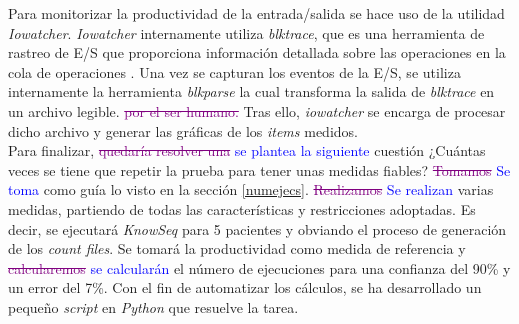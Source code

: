 \begin{table}[h]
    \centering
    \caption{Tiempos de ejecución para KnowSeq con distinto número de pacientes}
    \label{tab:my_label}
\end{table}
\begin{table}[h]
    \centering
\end{table}

Para monitorizar la productividad de la entrada/salida se hace uso de la utilidad \textit{Iowatcher}. \textit{Iowatcher} internamente utiliza \textit{blktrace}, que es una herramienta de rastreo de E/S que proporciona información detallada sobre las operaciones en la cola de operaciones \cite{blktrace}. Una vez se capturan los eventos de la E/S, se utiliza internamente la herramienta \textit{blkparse} la cual transforma la salida de \textit{blktrace} en un archivo legible. \textcolor{purple}{\sout{por el ser humano.}} Tras ello, \textit{iowatcher} se encarga de procesar dicho archivo y generar las gráficas de los \textit{items} medidos.\\

Para finalizar, \textcolor{purple}{\sout{quedaría resolver una}} \textcolor{blue}{se plantea la siguiente} cuestión ¿Cuántas veces se tiene que repetir la prueba para tener unas medidas fiables? \textcolor{purple}{\sout{Tomamos}} \textcolor{blue}{Se toma} como guía lo visto en la sección \ref{numejecs}. \textcolor{purple}{\sout{Realizamos}} \textcolor{blue}{Se realizan} varias medidas, partiendo de todas las características y restricciones adoptadas. Es decir, se ejecutará \textit{KnowSeq} para 5 pacientes y obviando el proceso de generación de los \textit{count files}. Se tomará la productividad como medida de referencia y \textcolor{purple}{\sout{calcularemos}} \textcolor{blue}{se calcularán} el número de ejecuciones para una confianza del 90\% y un error del 7\%. Con el fin de automatizar los cálculos, se ha desarrollado un pequeño \textit{script} en \textit{Python} que resuelve la tarea.\\

